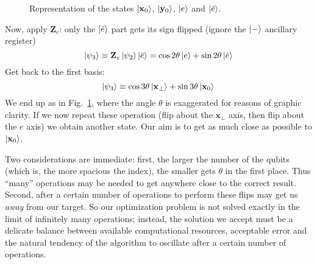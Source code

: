 \begin{figure}
	\centering
	
	\caption{Representation of the states $\ket{\mathbf{x}_0}$, $\ket{\mathbf{y}_0}$, $\ket{e}$ and $\ket{\Bar{e}}$.}
	\label{fig:grover algorithm graphic}
\end{figure}

Now, apply $\mathbf{Z}_e$: only the $\ket{\Bar{e}}$ part gets its sign flipped (ignore the $\ket{-}$ ancillary register)
\[
	\ket{\psi_3} \equiv \mathbf{Z}_e \ket{\psi_2} \ket{\Bar{e}} = \cos 2\theta \ket{e} + \sin 2\theta \ket{\Bar{e}}
\]
Get back to the first basis:
\[
	\ket{\psi_3} \equiv \cos 3\theta \ket{\mathbf{x}_\perp} + \sin 3\theta \ket{\mathbf{x}_0}
\]
We end up as in Fig.~\ref{fig:grover algorithm graphic}, where the angle $\theta$ is exaggerated for reasons of graphic clarity. If we now repeat these operation (flip about the $\mathbf{x}_\perp$ axis, then flip about the $e$ axis) we obtain another state. Our aim is to get as much close as possible to $\ket{\mathbf{x}_0}$.

Two considerations are immediate: first, the larger the number of the qubits (which is, the more spacious the index), the smaller gets $\theta$ in the first place. Thus ``many'' operations may be needed to get anywhere close to the correct result. Second, after a certain number of operations to perform these flips may get us \textit{away} from our target. So our optimization problem is not solved exactly in the limit of infinitely many operations; instead, the solution we accept must be a delicate balance between available computational resources, acceptable error and the natural tendency of the algorithm to oscillate after a certain number of operations. 

